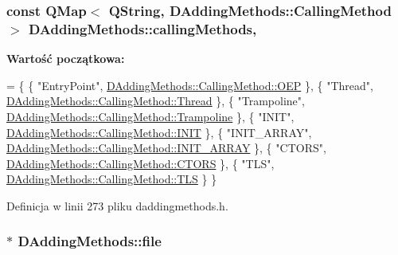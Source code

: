 \hypertarget{class_d_adding_methods_a4c746112dd790909f893063563cd7877}{
\subsubsection[{calling\-Methods}]{\setlength{\rightskip}{0pt plus 5cm}const Q\-Map$<$ Q\-String, {\bf D\-Adding\-Methods\-::\-Calling\-Method} $>$ D\-Adding\-Methods\-::calling\-Methods\hspace{0.3cm}{\ttfamily [static]}, {\ttfamily [private]}}}\label{class_d_adding_methods_a4c746112dd790909f893063563cd7877}
{\bfseries Wartość początkowa\-:}
\begin{DoxyCode}
=
\{
    \{ \textcolor{stringliteral}{"EntryPoint"}, \hyperlink{class_d_adding_methods_a8b52c07f1794d8c6cdd6f9b98be2bbf0a1f69192f5c5359619a4410d97d1655be}{DAddingMethods::CallingMethod::OEP} \},
    \{ \textcolor{stringliteral}{"Thread"}, \hyperlink{class_d_adding_methods_a8b52c07f1794d8c6cdd6f9b98be2bbf0ad97477d6d8a838ead9348185bb5b6742}{DAddingMethods::CallingMethod::Thread} \},
    \{ \textcolor{stringliteral}{"Trampoline"}, \hyperlink{class_d_adding_methods_a8b52c07f1794d8c6cdd6f9b98be2bbf0ad113494f870355ce123dfb74beea602d}{DAddingMethods::CallingMethod::Trampoline} \},
    \{ \textcolor{stringliteral}{"INIT"}, \hyperlink{class_d_adding_methods_a8b52c07f1794d8c6cdd6f9b98be2bbf0afaee4ca3c30ee18148ce3ada37466498}{DAddingMethods::CallingMethod::INIT} \},
    \{ \textcolor{stringliteral}{"INIT\_ARRAY"}, \hyperlink{class_d_adding_methods_a8b52c07f1794d8c6cdd6f9b98be2bbf0a8c11d1b1290b76379bf90434c0e83f4a}{DAddingMethods::CallingMethod::INIT\_ARRAY} \},
    \{ \textcolor{stringliteral}{"CTORS"}, \hyperlink{class_d_adding_methods_a8b52c07f1794d8c6cdd6f9b98be2bbf0a02f11aadd3ab1bd5b7ccd3040d8a0075}{DAddingMethods::CallingMethod::CTORS} \},
    \{ \textcolor{stringliteral}{"TLS"}, \hyperlink{class_d_adding_methods_a8b52c07f1794d8c6cdd6f9b98be2bbf0a099d7d04319e5191b7473e016c55e320}{DAddingMethods::CallingMethod::TLS} \}
\}
\end{DoxyCode}


Definicja w linii 273 pliku daddingmethods.\-h.

\hypertarget{class_d_adding_methods_a87bdff1dd02ac26df6c10648fe406cd9}{
\subsubsection[{file}]{$\ast$ D\-Adding\-Methods\-::file\hspace{0.3cm}{\ttfamily [protected]}}}\label{class_d_adding_methods_a87bdff1dd02ac26df6c10648fe406cd9}


